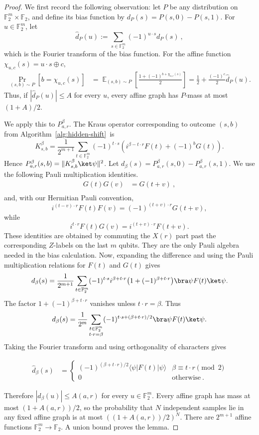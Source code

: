\documentclass[11pt]{article}
\newcommand{\E}{\mathop{\mathbb{E}}}
\newcommand{\F}{\mathbb{F}}
\begin{document}
\begin{proof}
We first record the following observation: let $P$ be any distribution on
$\F_2^m\times\F_2$, and define its bias function by
$d_P(s)=P(s,0)-P(s,1)$.  For $u\in\F_2^m$, let
$$
    \widehat d_P(u):=\sum_{s\in\F_2^m}(-1)^{u\cdot s}d_P(s)\ ,
$$
which is the Fourier transform of the bias function. For the affine function $\chi_{u,c}(s)=u\cdot s\oplus c$,
$$
\begin{aligned}
    \Pr_{(s,b)\sim P}[b=\chi_{u,c}(s)]
    &=\E_{(s,b)\sim P}\left[\frac{1+(-1)^{b+\chi_{u,c}(s)}}2\right]=\frac12+\frac{(-1)^c}{2}\widehat d_P(u).
\end{aligned}
$$
Thus, if $|\widehat d_P(u)|\le A$ for every $u$, every affine graph has
$P$-mass at most $(1+A)/2$.

We apply this to $P^\beta_{a,r}$. The Kraus operator corresponding to outcome
$(s,b)$ from Algorithm~\ref{alg:hidden-shift}~is
$$
    K^\beta_{s,b}=\frac{1}{2^{m+1}}
    \sum_{t\in\F_2^m}(-1)^{t\cdot s}
    \left(i^{\beta-t\cdot r}F(t)+(-1)^bG(t)\right).
$$
Hence $P^\beta_{a,r}(s,b)=\|K^\beta_{s,b}\ket\psi\|^2$.  Let
$d_\beta(s)=P^\beta_{a,r}(s,0)-P^\beta_{a,r}(s,1)$.  We use the following Pauli multiplication identities.
\begin{align}
    G(t)G(v) & = G(t+v)\ , \\
\end{align}
and, with our Hermitian Pauli convention,
$$
    i^{(t-v)\cdot r}F(t)F(v)
    =
    (-1)^{(t+v)\cdot r}G(t+v),
$$
while
$$
    i^{t\cdot r}F(t)G(v)
    =
    i^{(t+v)\cdot r}F(t+v).
$$
These identities are obtained by commuting the $X(r)$ part past the
corresponding $Z$-labels on the last $m$ qubits.  They are the only Pauli
algebra needed in the bias calculation. Now, expanding the difference
and using the Pauli multiplication relations for $F(t)$ and $G(t)$ gives
$$
    d_\beta(s)=\frac{1}{2^{m+1}}
    \sum_{t\in\F_2^m}(-1)^{t\cdot s}
    i^{\beta+t\cdot r}\bigl(1+(-1)^{\beta+t\cdot r}\bigr)
    \bra\psi F(t)\ket\psi.
$$
The factor $1+(-1)^{\beta+t\cdot r}$ vanishes unless $t\cdot r=\beta$.  Thus
$$
    d_\beta(s)=\frac{1}{2^m}
    \sum_{\substack{t\in\F_2^m\\ t\cdot r=\beta}}
    (-1)^{t\cdot s+(\beta+t\cdot r)/2}\bra\psi F(t)\ket\psi.
$$
Taking the Fourier transform and using orthogonality of characters gives

\begin{align}
    \widehat d_\beta(s) & = \begin{cases}
        (-1)^{(\beta + t\cdot r)/2} \langle \psi \vert F(t)\vert \psi \rangle & \beta \equiv t\cdot r\pmod{2}\\
        0 & \text{otherwise}\ .
    \end{cases}
\end{align}

Therefore $|\widehat d_\beta(u)|\le A(a,r)$ for every $u\in\F_2^m$.  Every
affine graph has mass at most $(1+A(a,r))/2$, so the probability that $N$
independent samples lie in any fixed affine graph is at most
$((1+A(a,r))/2)^N$.  There are $2^{m+1}$ affine functions
$\F_2^m\to\F_2$.  A union bound proves the lemma.
\end{proof}
\end{document}
